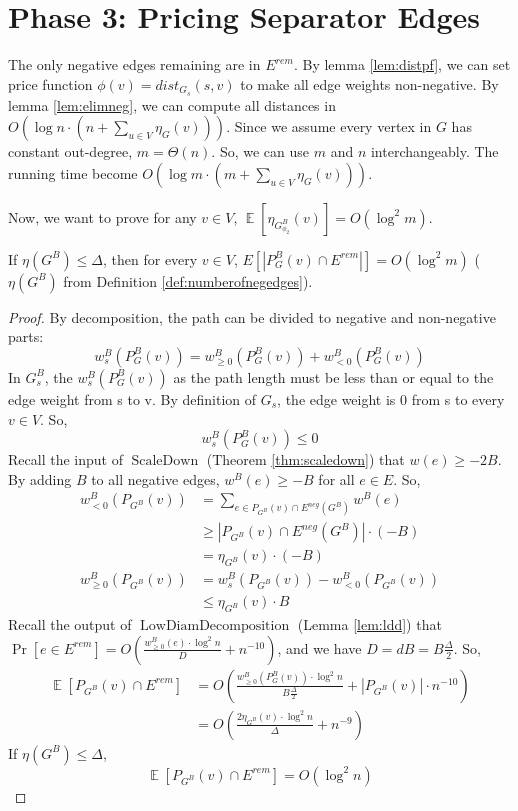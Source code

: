 \documentclass[11pt]{article}
\newcommand{\ScaleDown}{\operatorname{ScaleDown}}
\newcommand{\SCCDecomposition}{\operatorname{LowDiamDecomposition}}
\newcommand{\LowDiamDecomposition}{\SCCDecomposition}
\newcommand{\eneg}{E^{neg}}
\newcommand{\esep}{E^{rem}}
\newcommand{\GB}{G^{B}}
\newcommand{\wB}{w^{B}}
\DeclareMathOperator{\E}{\mathbb{E}}
\begin{document}
\section{Phase 3: Pricing Separator Edges}
The only negative edges remaining are in $\esep$. By lemma \ref{lem:distpf}, we can set price function $\phi(v) = dist_{G_s}(s, v)$ to make all edge weights non-negative. By lemma \ref{lem:elimneg}, we can compute all distances in $O(\log n \cdot (n + \sum_{u \in V}\eta_G(v)))$. Since we assume every vertex in $G$ has constant out-degree, $m = \Theta(n)$. So, we can use $m$ and $n$ interchangeably. The running time become $O(\log m \cdot (m + \sum_{u \in V}\eta_G(v)))$.

Now, we want to prove for any $v \in V$, $\E[\eta_{\GB_{\phi_2}}(v)] = O(\log^2 m)$.

\begin{lemma} \label{lem:pathwitherem}
    If $\eta(\GB) \le \Delta$, then for every $v \in V$, $E[|P_\GB(v) \cap \esep|] = O(\log^2 m)$ ($\eta(\GB)$ from Definition \ref{def:numberofnegedges}).
\end{lemma}

\begin{proof}
    By decomposition, the path can be divided to negative and non-negative parts:
    $$\wB_s(P_\GB(v)) = \wB_{\ge 0}(P_\GB(v)) + \wB_{<0}(P_\GB(v))$$
    In $\GB_s$, the $\wB_s(P_\GB(v))$ as the path length must be less than or equal to the edge weight from s to v. By definition of $G_s$, the edge weight is 0 from s to every $v \in V$. So,
    $$\wB_s(P_\GB(v)) \le 0$$
    Recall the input of $\ScaleDown$ (Theorem \ref{thm:scaledown}) that $w(e) \ge -2B$. By adding $B$ to all negative edges, $\wB(e) \ge -B$ for all $e \in E$. So,
    \begin{align*}
        \wB_{<0}(P_{\GB}(v)) &= \sum_{e \in P_{\GB}(v) \cap \eneg(\GB)} \wB(e)\\
        &\ge |P_{\GB}(v) \cap \eneg(\GB)| \cdot (-B)\\
        &= \eta_{\GB}(v) \cdot (-B)\\
        \wB_{\ge 0}(P_{\GB}(v)) &= \wB_s(P_{\GB}(v)) - \wB_{<0}(P_{\GB}(v))\\
        &\le \eta_{\GB}(v) \cdot B
    \end{align*}
    Recall the output of $\LowDiamDecomposition$ (Lemma \ref{lem:ldd}) that $\Pr[e \in \esep] = O(\frac{\wB_{\ge 0}(e) \cdot \log^2 n}{D} + n^{-10})$, and we have $D=dB=B\frac{\Delta}{2}$. So,
    \begin{align*}
        \E[P_{\GB}(v) \cap \esep] &= O(\frac{\wB_{\ge 0}(P_\GB(v)) \cdot \log^2 n}{B\frac{\Delta}{2}} + |P_{\GB}(v)| \cdot n^{-10})\\
        &=O(\frac{2\eta_{\GB}(v) \cdot \log^2 n}{\Delta} + n^{-9})
    \end{align*}
    If $\eta(\GB) \le \Delta$,
    $$\E[P_{\GB}(v) \cap \esep] = O(\log^2 n)$$
\end{proof}
\end{document}

